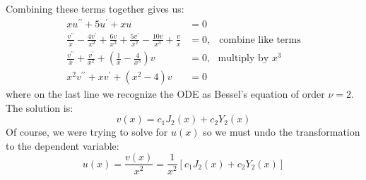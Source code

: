 Combining these terms together gives us:
\begin{align*}
xu^{\prime \prime} + 5u^{\prime} + xu &= 0 \\
\frac{v^{\prime \prime}}{x} - \frac{4v^{\prime}}{x^2} + \frac{6v}{x^3} + \frac{5v^{\prime}}{x^2} - \frac{10v}{x^{3}} + \frac{v}{x} &= 0, \ \ \text{ combine like terms}\\
\frac{v^{\prime \prime}}{x}+\frac{v^{\prime}}{x^2} + \left(\frac{1}{x}-\frac{4}{x^3} \right)v &= 0, \ \ \ \text{multiply by }x^3 \\
x^2v^{\prime \prime} + xv^{\prime} + \left(x^2 - 4 \right)v &= 0
\end{align*}
where on the last line we recognize the ODE as Bessel's equation of order $\nu = 2$.  The solution is:
\begin{equation*}
v(x) = c_1J_2(x) + c_2Y_2(x)
\end{equation*}
Of course, we were trying to solve for $u(x)$ so we must undo the transformation to the dependent variable:
\begin{equation*}
u(x) = \frac{v(x)}{x^2} = \frac{1}{x^2}\left[ c_1J_2(x) + c_2Y_2(x)\right]
\end{equation*}

\vspace{1.0cm}

